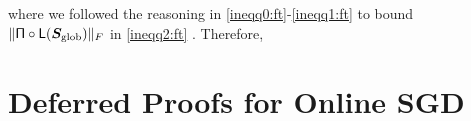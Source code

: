 where we followed the reasoning in \eqref{ineqq0:ft}-\eqref{ineqq1:ft} to bound $\lVert \mathsf{\Pi} \circ \mathsf{L} (\boldsymbol{S}_{\mathrm{glob}})  \rVert_F$ in \eqref{ineqq2:ft} . Therefore,

\section{Deferred Proofs for Online SGD}
\label{sec:onlinesgd}
